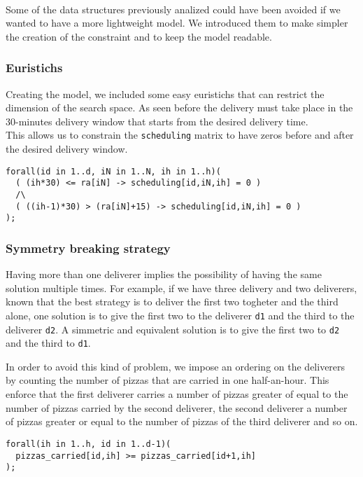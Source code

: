 \documentclass[10pt]{article}
\begin{document}
	\paragraph*{}
	Some of the data structures previously analized could have been avoided if we 
	wanted to have a more lightweight model. We introduced them to make simpler the
	creation of the constraint and to keep the model readable.

	\subsubsection{Euristichs}

	Creating the model, we included some easy euristichs that can restrict the dimension
	of the search space. As seen before the delivery must take place in the 30-minutes delivery window
	that starts from the desired delivery time.\\
	This allows us to constrain the \texttt{scheduling} matrix to have zeros before
	and after the desired delivery window.
	\begin{verbatim}
forall(id in 1..d, iN in 1..N, ih in 1..h)(
  ( (ih*30) <= ra[iN] -> scheduling[id,iN,ih] = 0 )
  /\
  ( ((ih-1)*30) > (ra[iN]+15) -> scheduling[id,iN,ih] = 0 )
);
	\end{verbatim}

	\subsubsection{Symmetry breaking strategy}
	Having more than one deliverer implies the possibility of having the same solution 
	multiple times. For example, if we have three delivery and two deliverers, known that
	the best strategy is to deliver the first two togheter and the third alone, one solution is 
	to give the first two to the deliverer \texttt{d1} and the third to the deliverer \texttt{d2}.
	A simmetric and equivalent solution is to give the first two to \texttt{d2} and 
	the third to \texttt{d1}.

	In order to avoid this kind of problem, we impose an ordering on the deliverers by 
	counting the number of pizzas that are carried in one half-an-hour. This enforce that 
	the first deliverer carries a number of pizzas greater of equal to the number of
	pizzas carried by the second deliverer, the second deliverer a number of pizzas greater or 
	equal to the number of pizzas of the third deliverer and so on.
\begin{verbatim}
forall(ih in 1..h, id in 1..d-1)(
  pizzas_carried[id,ih] >= pizzas_carried[id+1,ih]
);
\end{verbatim}
\end{document}
